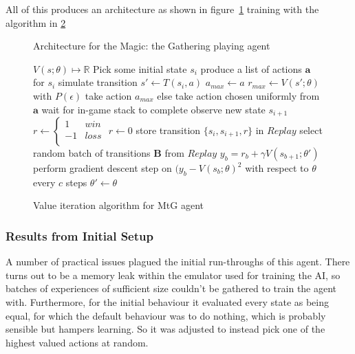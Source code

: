  All of this produces an architecture as shown in figure~\ref{fig:mtgarch} training with the algorithm in \ref{alg:mtgval}
  \begin{figure}[htbf]
  \centering

\caption{Architecture for the Magic: the Gathering playing agent}
\label{fig:mtgarch}
\end{figure}

 \begin{figure}[htbf]
 \centering
 \begin{algorithmic}
 \State $V(s; \theta) \mapsto \mathbb{R} $
 \Repeat
    \State Pick some initial state $s_i$
    \Repeat	
     \State produce a list of actions $\mathbf{a}$ for $s_i$
     	\State simulate transition $s' \gets T(s_i, a)$
     		\State $a_{max} \gets a $
     		\State $r_{max} \gets V(s';\theta)$
     	\EndIf
     \EndFor
    \State with $P(\epsilon)$ take action $a_{max}$ 
    \State else take action chosen uniformly from $\mathbf{a}$
    \State wait for in-game stack to complete
    \State observe new state $s_{i+1}$
    	\State $r \gets \begin{cases}
			1 & win \\
			-1 & loss \\
			\end{cases} $
    \Else
    	\State $r \gets 0$
    \EndIf
    \State store transition $\{s_i , s_{i+1}, r\}$ in $Replay$
    \State select random batch of transitions $\mathbf{B}$ from $Replay$
    	\State $y_b = r_b + \gamma V(s_{b+1} ; \theta ')$
    	\State perform gradient descent step on $(y_b - V(s_b; \theta)^2$ with respect to $\theta$
    \EndFor 
    \State every $c$ steps $\theta ' \gets \theta$
 \end{algorithmic}
 
\caption{Value iteration algorithm for MtG agent}
 \label{alg:mtgval}
\end{figure}
 

 \subsubsection{Results from Initial Setup}
A number of practical issues plagued the initial run-throughs of this agent. There turns out to be a memory leak within the emulator used for training the AI, so batches of experiences of sufficient size couldn't be gathered to train the agent with. Furthermore, for the initial  behaviour it evaluated every state as being equal, for which the default behaviour was to do nothing, which is probably sensible but hampers learning. So it was adjusted to instead pick one of the highest valued actions at random. 

